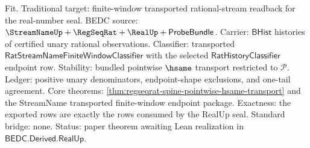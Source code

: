 Fit. Traditional target: finite-window transported rational-stream readback for
the real-number seal. BEDC source: $\StreamNameUp+\RegSeqRat+\RealUp+
\mathsf{ProbeBundle}$. Carrier: $\mathsf{BHist}$ histories of certified unary
rational observations. Classifier: transported
$\mathsf{RatStreamNameFiniteWindowClassifier}$ with the selected
$\mathsf{RatHistoryClassifier}$ endpoint row. Stability: bundled pointwise
$\hsame$ transport restricted to $\mathcal P$. Ledger: positive unary
denominators, endpoint-shape exclusions, and one-tail agreement. Core theorems:
\autoref{thm:regseqrat-spine-pointwise-hsame-transport} and the StreamName
transported finite-window endpoint package. Exactness: the exported rows are
exactly the rows consumed by the RealUp seal. Standard bridge: none. Status:
paper theorem awaiting Lean realization in $\mathsf{BEDC.Derived.RealUp}$.
